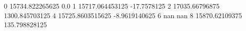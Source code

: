 0 15734.822265625 0.0
1 15717.064453125 -17.7578125
2 17035.66796875 1300.845703125
4 15725.8603515625 -8.9619140625
6 nan nan
8 15870.62109375 135.798828125
